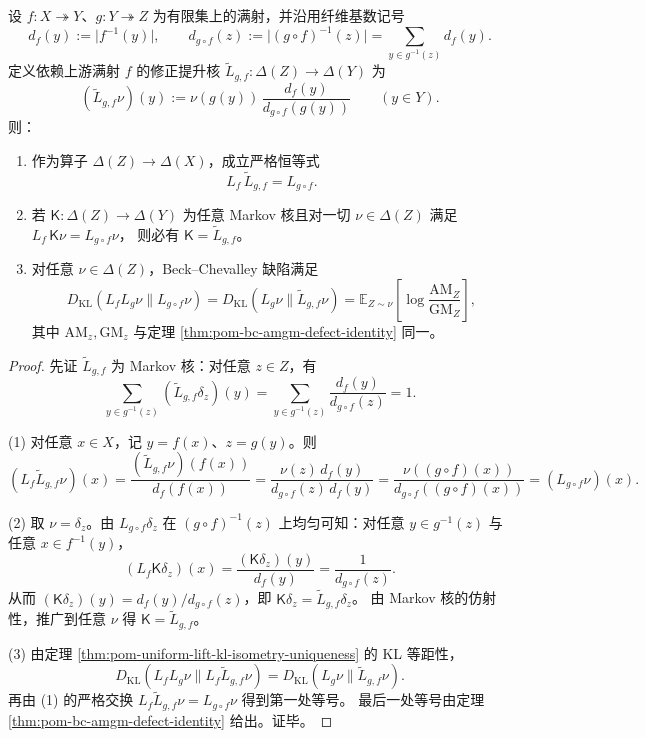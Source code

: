 \begin{theorem}\label{thm:pom-bc-discrete-jacobian-strictification}
设 \(f:X\twoheadrightarrow Y\)、\(g:Y\twoheadrightarrow Z\) 为有限集上的满射，并沿用纤维基数记号
\[
d_f(y):=\lvert f^{-1}(y)\rvert,\qquad
d_{g\circ f}(z):=\lvert(g\circ f)^{-1}(z)\rvert=\sum_{y\in g^{-1}(z)}d_f(y).
\]
定义依赖上游满射 \(f\) 的修正提升核 \(\widetilde L_{g,f}:\Delta(Z)\to\Delta(Y)\) 为
\[
(\widetilde L_{g,f}\nu)(y):=\nu(g(y))\,\frac{d_f(y)}{d_{g\circ f}(g(y))}\qquad(y\in Y).
\]
则：
\begin{enumerate}
  \item 作为算子 \(\Delta(Z)\to\Delta(X)\)，成立严格恒等式
  \[
  \boxed{\;L_f\,\widetilde L_{g,f}=L_{g\circ f}.\;}
  \]
  \item 若 \(\mathsf K:\Delta(Z)\to\Delta(Y)\) 为任意 Markov 核且对一切 \(\nu\in\Delta(Z)\) 满足
  \(
  L_f\,\mathsf K\nu=L_{g\circ f}\nu
  \)，
  则必有 \(\mathsf K=\widetilde L_{g,f}\)。
  \item 对任意 \(\nu\in\Delta(Z)\)，Beck--Chevalley 缺陷满足
  \[
  \boxed{\;
  D_{\mathrm{KL}}(L_fL_g\nu\|L_{g\circ f}\nu)
  =D_{\mathrm{KL}}(L_g\nu\|\widetilde L_{g,f}\nu)
  =\mathbb E_{Z\sim\nu}\!\left[\log\frac{\mathrm{AM}_Z}{\mathrm{GM}_Z}\right],\;}
  \]
  其中 \(\mathrm{AM}_z,\mathrm{GM}_z\) 与定理 \ref{thm:pom-bc-amgm-defect-identity} 同一。
\end{enumerate}
\end{theorem}
\begin{proof}
先证 \(\widetilde L_{g,f}\) 为 Markov 核：对任意 \(z\in Z\)，有
\[
\sum_{y\in g^{-1}(z)}(\widetilde L_{g,f}\delta_z)(y)
=\sum_{y\in g^{-1}(z)}\frac{d_f(y)}{d_{g\circ f}(z)}
=1.
\]
\par
(1) 对任意 \(x\in X\)，记 \(y=f(x)\)、\(z=g(y)\)。则
\[
(L_f\widetilde L_{g,f}\nu)(x)
=\frac{(\widetilde L_{g,f}\nu)(f(x))}{d_f(f(x))}
=\frac{\nu(z)\,d_f(y)}{d_{g\circ f}(z)\,d_f(y)}
=\frac{\nu((g\circ f)(x))}{d_{g\circ f}((g\circ f)(x))}
=(L_{g\circ f}\nu)(x).
\]
\par
(2) 取 \(\nu=\delta_z\)。由 \(L_{g\circ f}\delta_z\) 在 \((g\circ f)^{-1}(z)\) 上均匀可知：对任意 \(y\in g^{-1}(z)\) 与任意 \(x\in f^{-1}(y)\)，
\[
(L_f\mathsf K\delta_z)(x)=\frac{(\mathsf K\delta_z)(y)}{d_f(y)}=\frac1{d_{g\circ f}(z)}.
\]
从而 \((\mathsf K\delta_z)(y)=d_f(y)/d_{g\circ f}(z)\)，即 \(\mathsf K\delta_z=\widetilde L_{g,f}\delta_z\)。
由 Markov 核的仿射性，推广到任意 \(\nu\) 得 \(\mathsf K=\widetilde L_{g,f}\)。
\par
(3) 由定理 \ref{thm:pom-uniform-lift-kl-isometry-uniqueness} 的 KL 等距性，
\[
D_{\mathrm{KL}}(L_fL_g\nu\|L_f\widetilde L_{g,f}\nu)=D_{\mathrm{KL}}(L_g\nu\|\widetilde L_{g,f}\nu).
\]
再由 (1) 的严格交换 \(L_f\widetilde L_{g,f}\nu=L_{g\circ f}\nu\) 得到第一处等号。
最后一处等号由定理 \ref{thm:pom-bc-amgm-defect-identity} 给出。证毕。
\end{proof}

